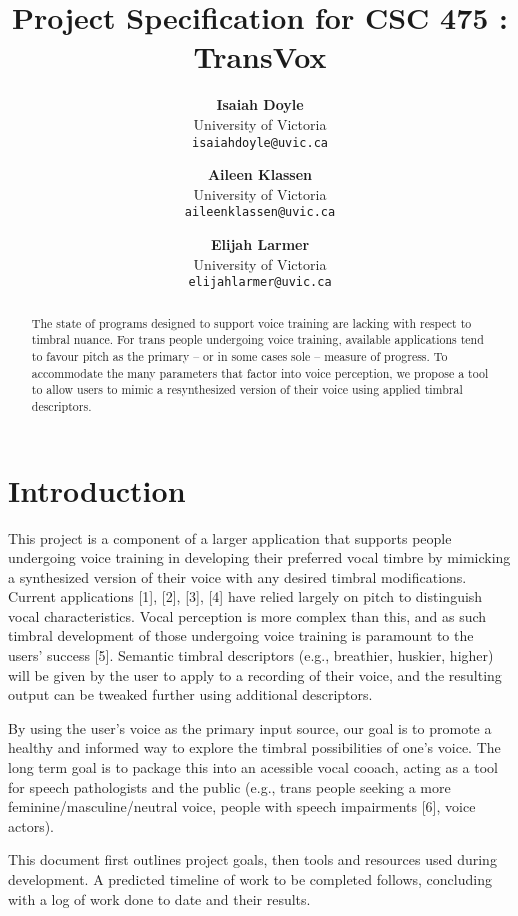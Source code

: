 \documentclass{article}
\title{Project Specification for CSC 475 \conferenceyear: TransVox}
\author{
   \textbf{Isaiah Doyle}\\ {University of Victoria \\\texttt{isaiahdoyle@uvic.ca}}
   \and
   \textbf{Aileen Klassen}\\ {University of Victoria\\\texttt{aileenklassen@uvic.ca}}
   \and
   \textbf{Elijah Larmer}\\ {University of Victoria \\\texttt{elijahlarmer@uvic.ca}}
}
\begin{document}
\maketitle{}

\begin{abstract}
  The state of programs designed to support voice training are lacking with respect to timbral nuance. For trans people undergoing voice training, available applications tend to favour pitch as the primary – or in some cases sole – measure of progress. To accommodate the many parameters that factor into voice perception, we propose a tool to allow users to mimic a resynthesized version of their voice using applied timbral descriptors.
\end{abstract}

\section{Introduction}\label{sec:introduction}

This project is a component of a larger application that supports people undergoing voice training in developing their preferred vocal timbre by mimicking a synthesized version of their voice with any desired timbral modifications. Current applications [1], [2], [3], [4] have relied largely on pitch to distinguish vocal characteristics. Vocal perception is more complex than this, and as such timbral development of those undergoing voice training is paramount to the users’ success [5]. Semantic timbral descriptors (e.g., breathier, huskier, higher) will be given by the user to apply to a recording of their voice, and the resulting output can be tweaked further using additional descriptors.

By using the user’s voice as the primary input source, our goal is to promote a healthy and informed way to explore the timbral possibilities of one’s voice. The long term goal is to package this into an acessible vocal cooach, acting as a tool for speech pathologists and the public (e.g., trans people seeking a more feminine/masculine/neutral voice, people with speech impairments [6], voice actors).

This document first outlines project goals, then tools and resources used during development. A predicted timeline of work to be completed follows, concluding with a log of work done to date and their results.
\end{document}
